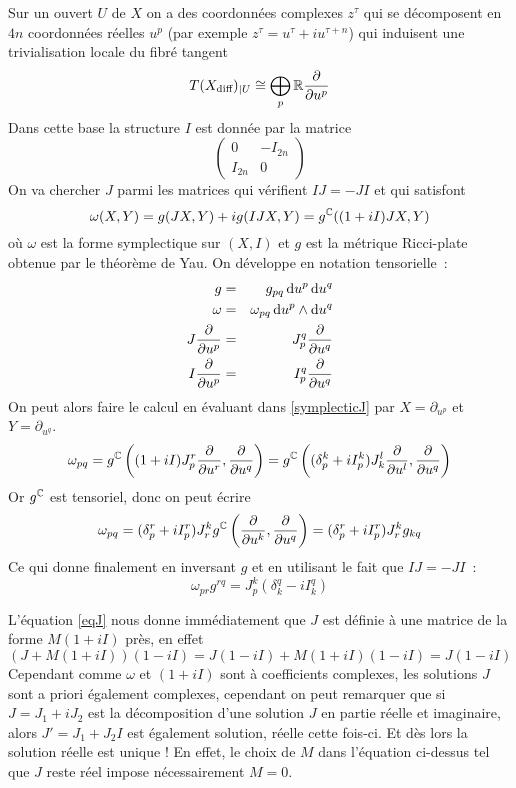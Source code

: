 \documentclass[a4paper,draft]{amsart}
\begin{document}
Sur un ouvert $U$ de $X$ on a des coordonnées complexes $z^\tau$ qui se décomposent en $4n$ coordonnées réelles $u^p$ (par exemple $z^\tau = u^\tau + i u^{\tau+n}$) qui induisent une trivialisation locale du fibré tangent \[
T(X_\text{diff})_{\vert U} \cong \bigoplus_p \mathbb{R} \dfrac{\partial{}}{\partial{u^p}}
\]
Dans cette base la structure $I$ est donnée par la matrice
\[
\begin{pmatrix}
0 & -I_{2n} \\ 
I_{2n} & 0
\end{pmatrix} 
\]
On va chercher $J$ parmi les matrices qui vérifient $IJ=-JI$ et qui satisfont 
\begin{equation}\label{symplecticJ}
\omega(X,Y) = g(JX,Y) + ig(IJX,Y) = g^{\mathbb{C}}((1+iI)JX,Y)
\end{equation}
où $\omega$ est la forme symplectique sur $(X,I)$ et $g$ est la métrique Ricci-plate obtenue par le théorème de Yau.
On développe en notation tensorielle~:
\begin{eqnarray*}
g & = & g_{pq} \operatorname{d\!} u^p \operatorname{d\!} u^q \\
\omega & = & \omega_{pq} \operatorname{d\!} u^p \wedge \operatorname{d\!} u^q \\
J\dfrac{\partial{}}{\partial{u^p}} & = & J^q_p\dfrac{\partial{}}{\partial{u^q}}\\
I\dfrac{\partial{}}{\partial{u^p}} & = & I^q_p\dfrac{\partial{}}{\partial{u^q}}\\
\end{eqnarray*}
On peut alors faire le calcul en évaluant dans \eqref{symplecticJ} par $X = \partial_{u^p}$ et $Y = \partial_{u^q}$.
\[
\omega_{pq} = g^{\mathbb{C}}\left((1+iI)J^r_p\dfrac{\partial{}}{\partial{u^r}},\dfrac{\partial{}}{\partial{u^q}}\right)
=g^{\mathbb{C}}\left(
(\delta_p^k+iI_p^k)J^l_k\dfrac{\partial{}}{\partial{u^l}},\dfrac{\partial{}}{\partial{u^q}}
\right)
\]
Or $g^{\mathbb{C}}$ est tensoriel, donc on peut écrire
\[
\omega_{pq}
=(\delta_p^r+iI_p^r) J^k_r g^{\mathbb{C}}\left(\dfrac{\partial{}}{\partial{u^k}},\dfrac{\partial{}}{\partial{u^q}}
\right) = (\delta_p^r+iI_p^r)J^k_r g_{kq}
\]
Ce qui donne finalement en inversant $g$ et en utilisant le fait que $IJ=-JI$~:
\begin{equation}\label{eqJ}
\omega_{pr}g^{rq} = J_p^k\left(\delta_k^q - i I_k^q\right)
\end{equation}

L'équation \eqref{eqJ} nous donne immédiatement que $J$ est définie à une matrice de la forme $M(1+iI)$ près, en effet
\[
(J+M(1+iI))(1-iI) = J(1-iI) + M(1+iI)(1-iI) = J(1-iI)
\]
Cependant comme $\omega$ et $(1+iI)$ sont à coefficients complexes, les solutions $J$ sont a priori également complexes, cependant on peut remarquer que si $J = J_1 + iJ_2$ est la décomposition d'une solution $J$ en partie réelle et imaginaire, alors $J' = J_1 + J_2I$ est également solution, réelle cette fois-ci.
Et dès lors la solution réelle est unique ! En effet, le choix de $M$ dans l'équation ci-dessus tel que $J$ reste réel impose nécessairement $M=0$.
\end{document}
